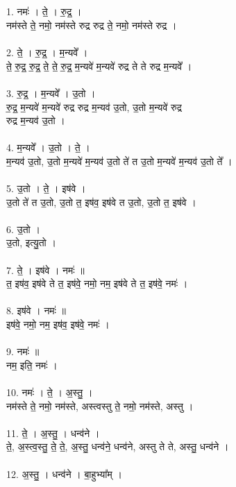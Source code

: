 \subsection{}
1. नमः॑ । ते॒ । रु॒द्र॒ । \\
नम॑स्ते ते॒ नमो॒ नम॑स्ते रुद्र रुद्र ते॒ नमो॒ नम॑स्ते रुद्र ।\\
\\
2. ते॒ । रु॒द्र॒ । म॒न्यवे᳚ ।\\
ते॒ रु॒द्र॒ रु॒द्र॒ ते॒ ते॒ रु॒द्र॒ म॒न्यवे॑ म॒न्यवे॑ रुद्र ते ते रुद्र म॒न्यवे᳚ ।\\
\\
3. रु॒द्र॒ । म॒न्यवे᳚ । उ॒तो ।\\
रु॒द्र॒ म॒न्यवे॑ म॒न्यवे॑ रुद्र रुद्र म॒न्यव॑ उ॒तो, उ॒तो म॒न्यवे॑ रुद्र\\
रुद्र म॒न्यव॑ उ॒तो ।\\
\\
4. म॒न्यवे᳚ । उ॒तो । ते॒ ।\\
म॒न्यव॑ उ॒तो, उ॒तो म॒न्यवे॑ म॒न्यव॑ उ॒तो ते॑ त उ॒तो म॒न्यवे॑ म॒न्यव॑ उ॒तो ते᳚ ।\\
\\
5. उ॒तो । ते॒ । इष॑वे ।\\
उ॒तो ते॑ त उ॒तो, उ॒तो त॒ इष॑व॒ इष॑वे त उ॒तो, उ॒तो त॒ इष॑वे ।\\
\\
6. उ॒तो ।\\
उ॒तो, इत्यु॒तो ।\\
\\
7. ते॒ । इष॑वे । नमः॑ ॥\\
त॒ इष॑व॒ इष॑वे ते त॒ इष॑वे॒ नमो॒ नम॒ इष॑वे ते त॒ इष॑वे॒ नमः॑ ।\\
\\
8. इष॑वे । नमः॑ ॥\\
इष॑वे॒ नमो॒ नम॒ इष॑व॒ इष॑वे॒ नमः॑ ।\\
\\
9. नमः॑ ॥\\
नम॒ इति॒ नमः॑ ।\\
\\
10. नमः॑ । ते॒ । अ॒स्तु॒ ।\\
नम॑स्ते ते॒ नमो॒ नम॑स्ते, अस्त्वस्तु ते॒ नमो॒ नम॑स्ते, अस्तु ।\\
\\
11. ते॒ । अ॒स्तु॒ । धन्व॑ने ।\\
ते॒, अ॒स्त्व॒स्तु॒ ते॒ ते॒, अ॒स्तु॒ धन्व॑ने॒ धन्व॑ने, अस्तु ते ते, अस्तु॒ धन्व॑ने ।\\
\\
12. अ॒स्तु॒ । धन्व॑ने । बा॒हुभ्या᳚म् ।\\
